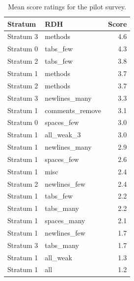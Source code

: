 \documentclass[%
class=scrreprt,
chapterprefix=false,%
open=right,%
twoside=false,%
paper=a4,%
logofile={Logo\_zentral\_farbig\_EN.png},%
thesistype=master,%
UKenglish,%
]{se2thesis}
\theoremstyle{definition}
\begin{document}
	
	\begin{table}[tb]
		\centering
		\caption{Mean score ratings for the pilot survey.}
		\vspace{8pt}
		\label{tab:pilot_survey_results}
		\begin{tabular}{llr}
			\toprule
			Stratum & RDH & Score \\
			\midrule
			Stratum 3 & methods & 4.6 \\
			Stratum 0 & tabs\_few & 4.3 \\
			Stratum 2 & tabs\_few & 3.8 \\
			Stratum 1 & methods & 3.7 \\
			Stratum 2 & methods & 3.7 \\
			Stratum 3 & newlines\_many & 3.3 \\
			Stratum 1 & comments\_remove & 3.1 \\
			Stratum 0 & spaces\_few & 3.0 \\
			Stratum 1 & all\_weak\_3 & 3.0 \\
			Stratum 1 & newlines\_many & 2.9 \\
			Stratum 1 & spaces\_few & 2.6 \\
			Stratum 1 & misc & 2.4 \\
			Stratum 2 & newlines\_few & 2.4 \\
			Stratum 1 & tabs\_few & 2.2 \\
			Stratum 1 & tabs\_many & 2.2 \\
			Stratum 1 & spaces\_many & 2.1 \\
			Stratum 1 & newlines\_few & 1.7 \\
			Stratum 3 & tabs\_many & 1.7 \\
			Stratum 1 & all\_weak & 1.3 \\
			Stratum 1 & all & 1.2 \\
			\bottomrule
		\end{tabular}
	\end{table}
	
\end{document}
